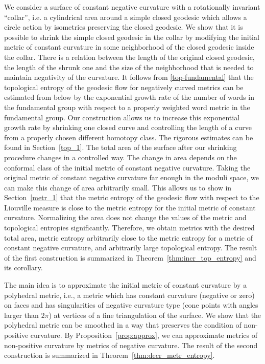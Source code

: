 \documentclass[12pt]{article}
\numberwithin{equation}{section}
\theoremstyle{definition}
\begin{document}
  We consider a surface of constant negative curvature with a rotationally invariant ``collar'',  i.e. a cylindrical area around a simple closed geodesic which allows a circle action by isometries preserving the closed geodesic. We show that it is possible to shrink the simple closed geodesic in the collar by modifying the initial metric of constant curvature in some neighborhood of the  closed geodesic inside the collar. There is a relation  between the length of the original closed geodesic,  the length of the shrunk one and the size of the neighborhood  that is needed to maintain negativity of the curvature. It follows from \eqref{top-fundamental} that  the topological entropy of the geodesic flow for negatively curved metrics  can be estimated from below by the  exponential growth rate  of  the number of words in the fundamental group with respect to a properly weighted word metric in the fundamental group. Our construction allows us to increase this  exponential growth rate  by shrinking one closed curve and controlling the length of a curve from a  properly chosen different homotopy class. The rigorous estimates can be found in Section~\ref{top_1}. The total area of the surface after our shrinking procedure changes in a controlled way. The change in area depends on the conformal class of the initial metric of constant negative curvature. Taking the original metric of constant negative curvature  far enough in the  moduli  space, we can make this change of area arbitrarily small. This allows us to show in Section~\ref{metr_1} that the metric entropy of the geodesic flow with respect to the Liouville measure is close to the metric entropy for the initial metric of constant curvature. Normalizing the area does not change the values of the metric and topological entropies significantly. Therefore, we obtain metrics with the desired total area, metric entropy arbitrarily close to the metric entropy for a metric of constant negative curvature, and arbitrarily large topological entropy. The result of the first construction is summarized in Theorem~\ref{thm:incr_top_entropy} and its corollary.
 \bigskip

  The main idea is to approximate the initial metric of constant curvature by a polyhedral metric, i.e., a metric which has constant curvature (negative or zero) on faces and has singularities of negative curvature type (cone points with angles larger than $2\pi$) at vertices of a fine  triangulation of the surface. We show that the polyhedral metric can be smoothed in a way that preserves the condition of non-positive curvature. By Proposition~\ref{prop:approx}, we can approximate metrics of non-positive curvature by metrics of negative curvature. The result of the second construction is summarized in Theorem~\ref{thm:decr_metr_entropy}.
\end{document}
